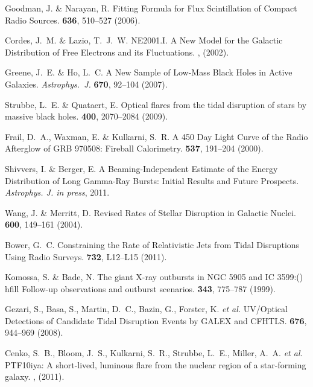 \begin{thebibliography}{10}
 {Goodman}, J. \& {Narayan},
R. {Fitting Formula for Flux Scintillation of Compact Radio Sources}.
 {\bf 636}, 510--527 (2006).

 {Cordes}, J.~M. \& {Lazio},
T.~J.~W. {NE2001.I. A New Model for the Galactic Distribution of Free
Electrons and its Fluctuations}.  ,
(2002).

 {Greene}, J.~E. \& {Ho}, L.~C. {A
New Sample of Low-Mass Black Holes in Active Galaxies}.  \newblock
{\it Astrophys.~J.} {\bf 670}, 92--104 (2007).

 {Strubbe}, L.~E. \&
{Quataert}, E. {Optical flares from the tidal disruption of stars by
massive black holes}.   {\bf
400}, 2070--2084 (2009).

 {Frail}, D.~A.,
{Waxman}, E.  \& {Kulkarni}, S.~R. {A 450 Day Light Curve of the Radio
Afterglow of GRB 970508: Fireball Calorimetry}.    {\bf 537}, 191--204 (2000).

 {Shivvers}, I. \& {Berger},
E. {A Beaming-Independent Estimate of the Energy Distribution of Long
Gamma-Ray Bursts: Initial Results and Future Prospects}.  \newblock
{\it Astrophys. J. in press}, 2011.

 {Wang}, J. \& {Merritt},
D. {Revised Rates of Stellar Disruption in Galactic Nuclei}.
 {\bf 600}, 149--161 (2004).

 {Bower}, G.~C. {Constraining the Rate of
Relativistic Jets from Tidal Disruptions Using Radio Surveys}.
 {\bf 732}, L12--L15 (2011).

 {Komossa}, S. \& {Bade},
N. {The giant X-ray outbursts in NGC 5905 and IC 3599:() hfill
Follow-up observations and outburst scenarios}.    {\bf 343}, 775--787 (1999).

 {Gezari}, S., {Basa}, S.,
{Martin}, D.~C., {Bazin}, G., {Forster}, K. {\it et al.} {UV/Optical
Detections of Candidate Tidal Disruption Events by GALEX and CFHTLS}.
 {\bf 676}, 944--969 (2008).

 {Cenko}, S.~B., {Bloom},
J.~S., {Kulkarni}, S.~R., {Strubbe}, L.~E., {Miller}, A.~A. {\it et
al.} {PTF10iya: A short-lived, luminous flare from the nuclear region
of a star-forming galaxy}.  , (2011).

\end{thebibliography}

